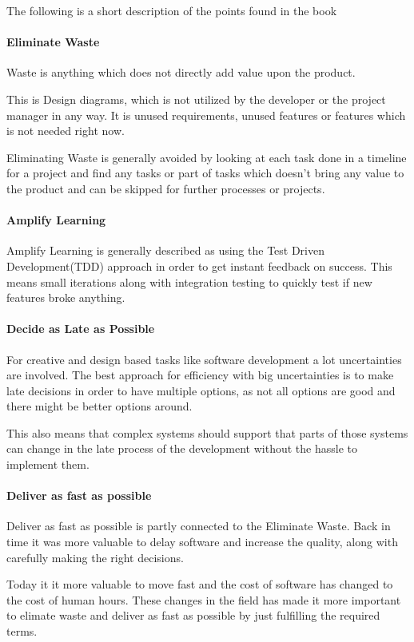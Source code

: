 \documentclass{sig-alternate}
\begin{document}
The following is a short description of the points found in the book \cite{poppendieck:lean}

\paragraph{Eliminate Waste}
Waste is anything which does not directly add value upon the product. 

This is Design diagrams, which is not utilized by the developer or the project manager in any way. 
It is unused requirements, unused features or features which is not needed right now. 

Eliminating Waste is generally avoided by looking at each task done in a timeline for a project
and find any tasks or part of tasks which doesn't bring any value to the product and can be 
skipped for further processes or projects.
 
\paragraph{Amplify Learning}
Amplify Learning is generally described as using the Test Driven Development(TDD) approach in order to 
get instant feedback on success.
This means small iterations along with integration testing to quickly test if new features broke anything.

\paragraph{Decide as Late as Possible}
For creative and design based tasks like software development a lot uncertainties are involved. 
The best approach for efficiency with big uncertainties is to make late decisions in order to have multiple
options, as not all options are good and there might be better options around. 

This also means that complex systems should support that parts of those systems can change in the late process
 of the development without the hassle to implement them.

\paragraph{Deliver as fast as possible}
Deliver as fast as possible is partly connected to the Eliminate Waste. 
Back in time it was more valuable to delay software and increase the quality, along with carefully making 
the right decisions.

Today it it more valuable to move fast and the cost of software has changed to the cost of human hours. 
These changes in the field has made it more important to elimate waste and deliver as fast as possible 
by just fulfilling the required terms.
\end{document}
